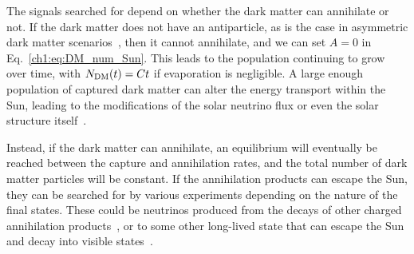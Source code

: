 The signals searched for depend on whether the dark matter can annihilate or not. If the dark matter does not have an antiparticle, as is the case in asymmetric dark matter scenarios~\cite{Petraki:2013wwa_Reviewasymmetricdark}, then it cannot annihilate, and we can set $A = 0$ in Eq.~\ref{ch1:eq:DM_num_Sun}. This leads to the population continuing to grow over time, with $N_\mathrm{DM}(t) = Ct$ if evaporation is negligible. A large enough population of captured dark matter can alter the energy transport within the Sun, leading to the modifications of the solar neutrino flux or even the solar structure itself~\cite{Franarin:2018gfk_jun_JUNOSensitivityResonant, Cumberbatch:2010hh_LightWIMPsSun, Vincent:2013lua_apr_Thermalconductiondark, Vincent:2015gqa_aug_Generalisedformfactor}. 

Instead, if the dark matter can annihilate, an equilibrium will eventually be reached between the capture and annihilation rates, and the total number of dark matter particles will be constant. If the annihilation products can escape the Sun, they can be searched for by various experiments depending on the nature of the final states.
These could be neutrinos produced from the decays of other charged annihilation products~\cite{Super-Kamiokande:2011wjy_IndirectSearchWIMPs, Super-Kamiokande:2015xms_apr_Searchneutrinosannihilation, ANTARES:2016obx_may_SearchSecludedDark, ANTARES:2016xuh_aug_LimitsDarkMatter, IceCube:2016dgk_Searchannihilatingdark}, or to some other long-lived state that can escape the Sun and decay into visible states~\cite{Batell:2009zp_SolarGammaRays, Schuster:2009au_TerrestrialSolarLimits, Bell:2011sn_Enhancedneutrinosignals, Feng:2016ijc_jun_DarkSunshineDetecting, Leane:2017vag_jun_PowerfulSolarSignatures}.


